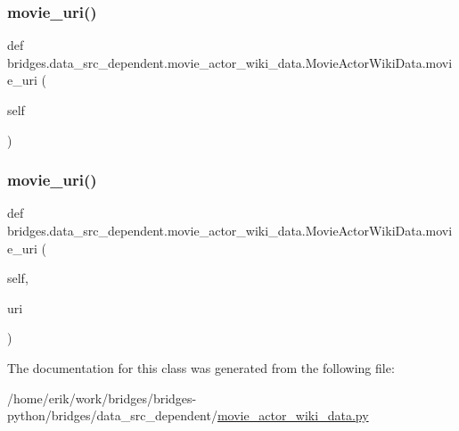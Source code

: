 \subsubsection{\texorpdfstring{movie\+\_\+uri()}{movie\_uri()}\hspace{0.1cm}{\footnotesize\ttfamily [1/2]}}
{\footnotesize\ttfamily def bridges.\+data\+\_\+src\+\_\+dependent.\+movie\+\_\+actor\+\_\+wiki\+\_\+data.\+Movie\+Actor\+Wiki\+Data.\+movie\+\_\+uri (\begin{DoxyParamCaption}\item[{}]{self }\end{DoxyParamCaption})}

\mbox{\label{classbridges_1_1data__src__dependent_1_1movie__actor__wiki__data_1_1_movie_actor_wiki_data_ae9e09370897da0ed4daa3a9378907b50}} 
\subsubsection{\texorpdfstring{movie\+\_\+uri()}{movie\_uri()}\hspace{0.1cm}{\footnotesize\ttfamily [2/2]}}
{\footnotesize\ttfamily def bridges.\+data\+\_\+src\+\_\+dependent.\+movie\+\_\+actor\+\_\+wiki\+\_\+data.\+Movie\+Actor\+Wiki\+Data.\+movie\+\_\+uri (\begin{DoxyParamCaption}\item[{}]{self,  }\item[{}]{uri }\end{DoxyParamCaption})}



The documentation for this class was generated from the following file\+:\begin{DoxyCompactItemize}
\item 
/home/erik/work/bridges/bridges-\/python/bridges/data\+\_\+src\+\_\+dependent/\hyperlink{movie__actor__wiki__data_8py}{movie\+\_\+actor\+\_\+wiki\+\_\+data.\+py}\end{DoxyCompactItemize}
